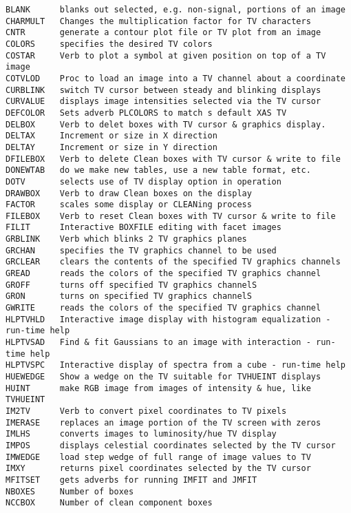 
\vskip 0.5pt
\bbve\begin{verbatim}
BLANK      blanks out selected, e.g. non-signal, portions of an image
CHARMULT   Changes the multiplication factor for TV characters
CNTR       generate a contour plot file or TV plot from an image
COLORS     specifies the desired TV colors
COSTAR     Verb to plot a symbol at given position on top of a TV image
COTVLOD    Proc to load an image into a TV channel about a coordinate
CURBLINK   switch TV cursor between steady and blinking displays
CURVALUE   displays image intensities selected via the TV cursor
DEFCOLOR   Sets adverb PLCOLORS to match s default XAS TV
DELBOX     Verb to delet boxes with TV cursor & graphics display.
DELTAX     Increment or size in X direction
DELTAY     Increment or size in Y direction
DFILEBOX   Verb to delete Clean boxes with TV cursor & write to file
DONEWTAB   do we make new tables, use a new table format, etc.
DOTV       selects use of TV display option in operation
DRAWBOX    Verb to draw Clean boxes on the display
FACTOR     scales some display or CLEANing process
FILEBOX    Verb to reset Clean boxes with TV cursor & write to file
FILIT      Interactive BOXFILE editing with facet images
GRBLINK    Verb which blinks 2 TV graphics planes
GRCHAN     specifies the TV graphics channel to be used
GRCLEAR    clears the contents of the specified TV graphics channels
GREAD      reads the colors of the specified TV graphics channel
GROFF      turns off specified TV graphics channelS
GRON       turns on specified TV graphics channelS
GWRITE     reads the colors of the specified TV graphics channel
HLPTVHLD   Interactive image display with histogram equalization - run-time help
HLPTVSAD   Find & fit Gaussians to an image with interaction - run-time help
HLPTVSPC   Interactive display of spectra from a cube - run-time help
HUEWEDGE   Show a wedge on the TV suitable for TVHUEINT displays
HUINT      make RGB image from images of intensity & hue, like TVHUEINT
IM2TV      Verb to convert pixel coordinates to TV pixels
IMERASE    replaces an image portion of the TV screen with zeros
IMLHS      converts images to luminosity/hue TV display
IMPOS      displays celestial coordinates selected by the TV cursor
IMWEDGE    load step wedge of full range of image values to TV
IMXY       returns pixel coordinates selected by the TV cursor
MFITSET    gets adverbs for running IMFIT and JMFIT
NBOXES     Number of boxes
NCCBOX     Number of clean component boxes

\end{verbatim}
